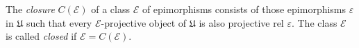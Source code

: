 The \textit{closure} $C(\mathcal{E})$ of a class $\mathcal{E}$ of epimorphisms consists of those epimorphisms $\varepsilon$ in $\mathfrak{U}$ such that every $\mathcal{E}$-projective object of $\mathfrak{U}$ is also projective rel $\varepsilon$. The class $\mathcal{E}$ is called \textit{closed} if $\mathcal{E} = C(\mathcal{E})$.